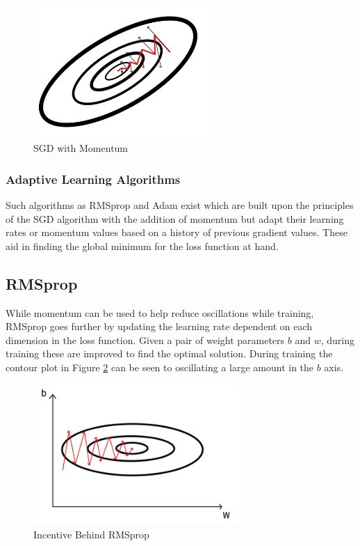\begin{figure}[h]
    \centering
        \includegraphics[width=0.6\textwidth]{figures/dl/momentum.jpeg}
    \caption{SGD with Momentum \cite{Goodfellow-et-al-2016}}\label{fig:Momentum}
\end{figure}

\subsubsection{Adaptive Learning Algorithms}
Such algorithms as RMSprop and Adam exist which are built upon the principles of the SGD algorithm with the addition of momentum but adapt their learning rates or momentum values based on a history of previous gradient values.
These aid in finding the global minimum for the loss function at hand.

\subsection{RMSprop}
While momentum can be used to help reduce oscillations while training, RMSprop goes further by updating the learning rate dependent on each dimension in the loss function.
Given a pair of weight parameters $b$ and $w$, during training these are improved to find the optimal solution.
During training the contour plot in Figure \ref{fig:rmsprop} can be seen to oscillating a large amount in the $b$ axis.

\begin{figure}[h]
    \centering
        \includegraphics[width=0.7\textwidth]{figures/dl/rmsprop.jpeg}
    \caption{Incentive Behind RMSprop \cite{Goodfellow-et-al-2016}}\label{fig:rmsprop}
\end{figure}

